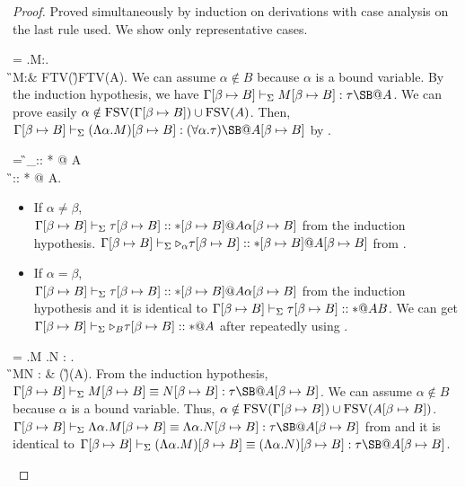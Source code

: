 \begin{proof}
    Proved simultaneously by induction on derivations with case analysis on the last rule used.
    We show only representative cases.
    {
        \newcommand{\SB}{[\beta \mapsto B]}
        \newcommand{\GG}{\G\SB}
        \newcommand{\GGV}{\G\SB \V}

        \begin{rneqncase}{\TGen{}}{
                 = \Lambda\alpha.M:\forall\alpha.\tau@A\\
                \G\V M:\tau@A & \alpha\notin\rm{FTV}(\G)\cup\rm{FTV}(A).
                }
                We can assume $\alpha \notin B$ because $\alpha$ is a bound variable.
                By the induction hypothesis, we have \(\G\SB\V M\SB:\tau\SB@A\).
                We can prove easily $\alpha \notin \FTV(\GG) \cup \FTV(A)$.
                Then, \(\GGV (\Lambda\alpha.M)\SB:(\forall\alpha.\tau)\SB@A\SB\) by \TGen.
        \end{rneqncase}

        \begin{rneqncase}{\KTW{}}{
                 = \G\V \TW_\alpha \tau :: * @ A\\
                \G\V \tau :: * @ A\alpha.
                }
                \begin{itemize}
                    \item If $\alpha \neq \beta$,\\
                        \( \GGV \tau\SB :: *\SB @ A\alpha\SB \) from the induction hypothesis.
                        \( \GGV \TW_\alpha \tau\SB :: *\SB @ A\SB \) from \KTW.

                    \item If $\alpha = \beta$, \\
                        \( \GGV \tau\SB :: *\SB @ A\alpha\SB \) from the induction hypothesis and
                        it is identical to \( \GGV \tau\SB :: * @ AB \).
                        We can get \( \GGV \TW_B \tau\SB :: * @ A \) after repeatedly using \KTW{}.

                \end{itemize}
        \end{rneqncase}

        \begin{rneqncase}{\QGen{}}{
                 = \Lambda\alpha.M \E \Lambda\alpha.N : \forall\alpha.\tau@A\\
                \G\V M\E N : \tau@A &  \alpha \notin \FTV(\G)\cup\FTV(A).
                }
                From the induction hypothesis, \( \GGV M\SB \E N\SB : \tau\SB@A\SB \).
                We can assume \(\alpha \notin B \) because \(\alpha\) is a bound variable.
                Thus, \( \alpha \notin \FTV(\G\SB)\cup\FTV(A\SB) \).
                \( \GGV \Lambda\alpha.M\SB \E \Lambda\alpha.N\SB : \tau\SB@A\SB \) from \QGen{} and
                it is identical to \( \GGV (\Lambda\alpha.M)\SB \E (\Lambda\alpha.N)\SB : \tau\SB@A\SB \).
        \end{rneqncase}
        }

\end{proof}


